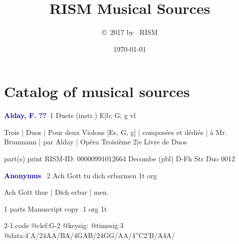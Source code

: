\documentclass[twocolumn]{book}
\title{RISM Musical Sources}
\author{\copyright \ 2017 by \ RISM}
\date{\today}
\begin{document}
\maketitle
\thispagestyle{empty}
\renewcommand*\contentsname{\hfill Table of content \hfill}
\tableofcontents
\thispagestyle{empty}
\newcommand\hfillplus[1]{{\unskip\nobreak\hfill\penalty50\
  \mbox{}\nobreak\hfill#1}}
\newcommand\invisiblesection[1]{%
  \refstepcounter{section}%
  \addcontentsline{toc}{section}{\protect\numberline{\thesection}#1}%
  \sectionmark{#1}}

\chapter*{\centering Catalog of musical sources}
\fancyhead{}
\setlength{\columnseprule}{0.5pt}

\newline \par \vspace{7pt} \textcolor{darkblue}{\textbf{Alday, F.  ??}}\hfillplus{1}
\newline Duets (instr.)  E|b; G; g  
 vl
\newline \begin{itshape}Trois | Duos | Pour deux Violons [Es, G, g] | composées et dédiés | à Mr. Brunmann | par Alday | Opéra Troisième 2|e Livre de Duos\end{itshape} 
\newline \textcolor{darkblue}{\ding{\numexpr181 + 01}}  part(s)  
\newline print
\newline RISM-ID: 00000991012664
\newline Decombe  (pbl)
\newline D-Fh  Str Duo 0012
\newline \par \vspace{7pt} \textcolor{darkblue}{\textbf{Anonymus  }}\hfillplus{2}
\newline Ach Gott tu dich erbarmen  1t  
\newline org
\newline \begin{itshape}[f.23v, at left:] Ach Gott thue | Dich erbar | men.\end{itshape} 
\newline \textcolor{darkblue}{\ding{\numexpr181 + 01}}  1 parts  
\newline Manuscript copy
.1  org  1t  
\begin{filecontents*}{2-1.code}
@clef:G-2
@keysig:
@timesig:3
@data:4'A/24AA/BA/4GAB/24GG/AA/4''C2'B/A4A/
\end{filecontents*}
\newline
%
\end{document}
